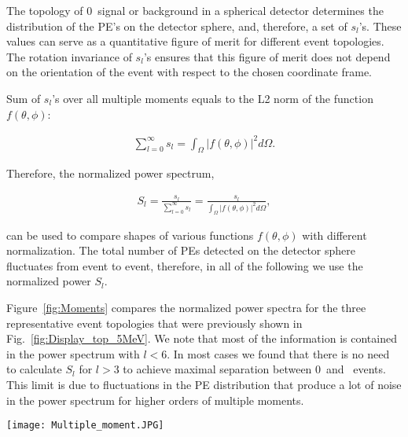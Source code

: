 The topology of 0\nbb~signal or background in a spherical detector determines the distribution of the PE's on the detector sphere, and, therefore, a set of $s_l$'s. These values can serve as a quantitative figure of merit for different event topologies. The rotation invariance of $s_l$'s ensures that this figure of merit does not depend on the orientation of the event with respect to the chosen coordinate frame.

Sum of $s_l$'s over all multiple moments equals to the L2 norm of the function $f(\theta,\phi)$:

\begin{eqnarray}
\label{eq5}
\sum_{l=0}^{\infty} s_l = \int_{\Omega} |f(\theta,\phi)|^2 d\Omega.
\end{eqnarray}

Therefore, the normalized power spectrum,

\begin{eqnarray}
\label{eq6}
S_l = \frac{s_l}{\sum_{l=0}^{\infty} s_l} =  \frac{s_l}{\int_{\Omega} |f(\theta,\phi)|^2 d\Omega},
\end{eqnarray}

can be used to compare shapes of various functions $f(\theta,\phi)$ with different normalization. The total number of PEs detected on the detector sphere fluctuates from event to event, therefore, in all of the following we use the normalized power $S_l$.

Figure~\ref{fig:Moments} compares the normalized power spectra for the three representative event topologies that were previously shown in Fig.~\ref{fig:Display_top_5MeV}. We note that most of the information is contained in the power spectrum with $l<$6. In most cases we found that there is no need to calculate $S_l$ for $l>$3 to achieve maximal separation between 0\nbb~and \B~events. This limit is due to fluctuations in the PE distribution that produce a lot of noise in the power spectrum for higher orders of multiple moments.

\begin{figure*}[h]
  \centering
  \texttt{[image: Multiple\_moment.JPG]}
  \caption{Average $S_l$ values for two electrons at 180 degree
    (\emph{color1}) and 90 degree (\emph{color2}) 1.5~MeV each and a
    single electron (\emph{color3}) with the energy of 3~MeV. Error
    bars are RMS values of each corresponding individual $S_l$
    distribution (each consists of 1000 events simulated at the center
    of the detector) indicating typical event-by-event variation.}
\label{fig:Moments}
\end{figure*}

